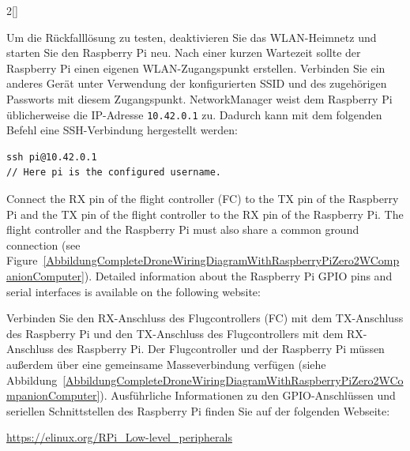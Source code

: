 \begin{paracol}{2}[]
\colger

Um die Rückfalllösung zu testen, deaktivieren Sie das WLAN-Heimnetz und starten Sie den Raspberry Pi neu. Nach einer kurzen Wartezeit sollte der Raspberry Pi einen eigenen WLAN-Zugangspunkt erstellen. Verbinden Sie ein anderes Gerät unter Verwendung der konfigurierten SSID und des zugehörigen Passworts mit diesem Zugangspunkt. NetworkManager weist dem Raspberry Pi üblicherweise die IP-Adresse \verb!10.42.0.1! zu. Dadurch kann mit dem folgenden Befehl eine SSH-Verbindung hergestellt werden:

\colende


\begin{lstlisting}[style=shell]
ssh pi@10.42.0.1
// Here pi is the configured username.
\end{lstlisting}


\renewcommand{\deutschertitel}{Hardwareverbindungen}
\renewcommand{\englischertitel}{Hardware Connections}
\makrounterabschnitt

Connect the RX pin of the flight controller (FC) to the TX pin of the Raspberry Pi and the TX pin of the flight controller to the RX pin of the Raspberry Pi. The flight controller and the Raspberry Pi must also share a common ground connection (see Figure~\ref{AbbildungCompleteDroneWiringDiagramWithRaspberryPiZero2WCompanionComputer}). Detailed information about the Raspberry Pi GPIO pins and serial interfaces is available on the following website:

\colger

Verbinden Sie den RX-Anschluss des Flugcontrollers (FC) mit dem TX-Anschluss des Raspberry Pi und den TX-Anschluss des Flugcontrollers mit dem RX-Anschluss des Raspberry Pi. Der Flugcontroller und der Raspberry Pi müssen außerdem über eine gemeinsame Masseverbindung verfügen (siehe Abbildung~\ref{AbbildungCompleteDroneWiringDiagramWithRaspberryPiZero2WCompanionComputer}). Ausführliche Informationen zu den GPIO-Anschlüssen und seriellen Schnittstellen des Raspberry Pi finden Sie auf der folgenden Webseite:

\colende

\smallskip
\url{https://elinux.org/RPi_Low-level_peripherals}
\smallskip
\colstart


\end{paracol}
